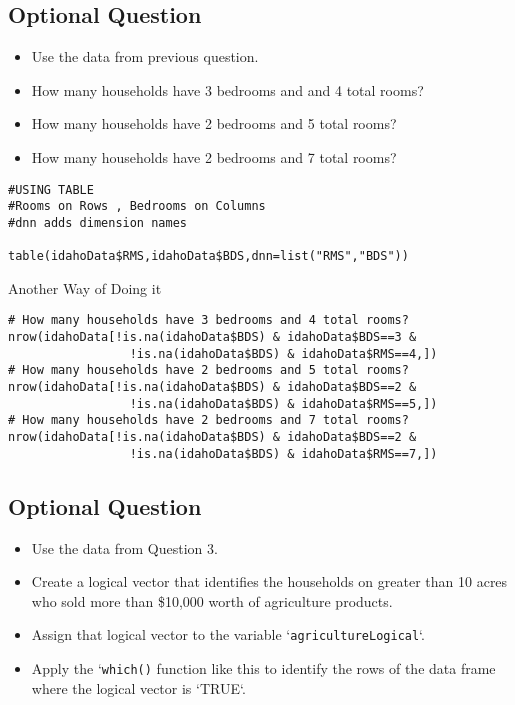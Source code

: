 \documentclass[]{article}
\begin{document}
\newpage
\subsection*{Optional Question}

\begin{itemize}
\item Use the data from previous question. 
\item How many households have 3 bedrooms and and 4 total rooms? 
\item How many households have 2 bedrooms and 5 total rooms? 
\item How many households have 2 bedrooms and 7 total rooms?
\end{itemize}
\begin{framed}
\begin{verbatim}
#USING TABLE
#Rooms on Rows , Bedrooms on Columns
#dnn adds dimension names

table(idahoData$RMS,idahoData$BDS,dnn=list("RMS","BDS"))

\end{verbatim}
\end{framed}
Another Way of Doing it
\begin{framed}
\begin{verbatim}
# How many households have 3 bedrooms and 4 total rooms?
nrow(idahoData[!is.na(idahoData$BDS) & idahoData$BDS==3 &
                 !is.na(idahoData$BDS) & idahoData$RMS==4,])
# How many households have 2 bedrooms and 5 total rooms?
nrow(idahoData[!is.na(idahoData$BDS) & idahoData$BDS==2 &
                 !is.na(idahoData$BDS) & idahoData$RMS==5,])
# How many households have 2 bedrooms and 7 total rooms?
nrow(idahoData[!is.na(idahoData$BDS) & idahoData$BDS==2 &
                 !is.na(idahoData$BDS) & idahoData$RMS==7,])

\end{verbatim}
\end{framed}


\newpage
\subsection*{Optional Question}
\begin{itemize}
\item Use the data from Question 3. 
\item Create a logical vector that identifies the households on greater than 10 acres who sold more than \$10,000 worth of agriculture products. 
\item Assign that logical vector to the variable `\texttt{agricultureLogical}`. 
\item Apply the `\texttt{which()} function like this to identify the rows of the data frame where the logical vector is `TRUE`.
\end{itemize}
\end{document}
